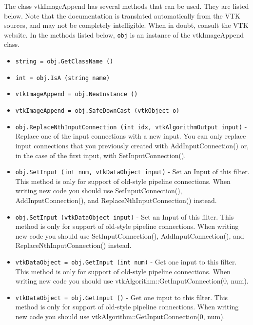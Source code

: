 The class vtkImageAppend has several methods that can be used.
  They are listed below.
Note that the documentation is translated automatically from the VTK sources,
and may not be completely intelligible.  When in doubt, consult the VTK website.
In the methods listed below, \verb|obj| is an instance of the vtkImageAppend class.
\begin{itemize}
\item  \verb|string = obj.GetClassName ()|

\item  \verb|int = obj.IsA (string name)|

\item  \verb|vtkImageAppend = obj.NewInstance ()|

\item  \verb|vtkImageAppend = obj.SafeDownCast (vtkObject o)|

\item  \verb|obj.ReplaceNthInputConnection (int idx, vtkAlgorithmOutput input)| -  Replace one of the input connections with a new input.  You can
 only replace input connections that you previously created with
 AddInputConnection() or, in the case of the first input,
 with SetInputConnection().

\item  \verb|obj.SetInput (int num, vtkDataObject input)| -  Set an Input of this filter.  This method is only for support of
 old-style pipeline connections.  When writing new code you should
 use SetInputConnection(), AddInputConnection(), and
 ReplaceNthInputConnection() instead.

\item  \verb|obj.SetInput (vtkDataObject input)| -  Set an Input of this filter.  This method is only for support of
 old-style pipeline connections.  When writing new code you should
 use SetInputConnection(), AddInputConnection(), and
 ReplaceNthInputConnection() instead.

\item  \verb|vtkDataObject = obj.GetInput (int num)| -  Get one input to this filter. This method is only for support of
 old-style pipeline connections.  When writing new code you should
 use vtkAlgorithm::GetInputConnection(0, num).

\item  \verb|vtkDataObject = obj.GetInput ()| -  Get one input to this filter. This method is only for support of
 old-style pipeline connections.  When writing new code you should
 use vtkAlgorithm::GetInputConnection(0, num).


\end{itemize}

